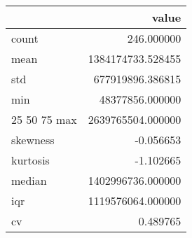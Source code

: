 \begin{tabular}{lr}
\toprule
 & value \\
\midrule
count & 246.000000 \\
mean & 1384174733.528455 \\
std & 677919896.386815 \\
min & 48377856.000000 \\
25%
50%
75%
max & 2639765504.000000 \\
skewness & -0.056653 \\
kurtosis & -1.102665 \\
median & 1402996736.000000 \\
iqr & 1119576064.000000 \\
cv & 0.489765 \\
\bottomrule
\end{tabular}
